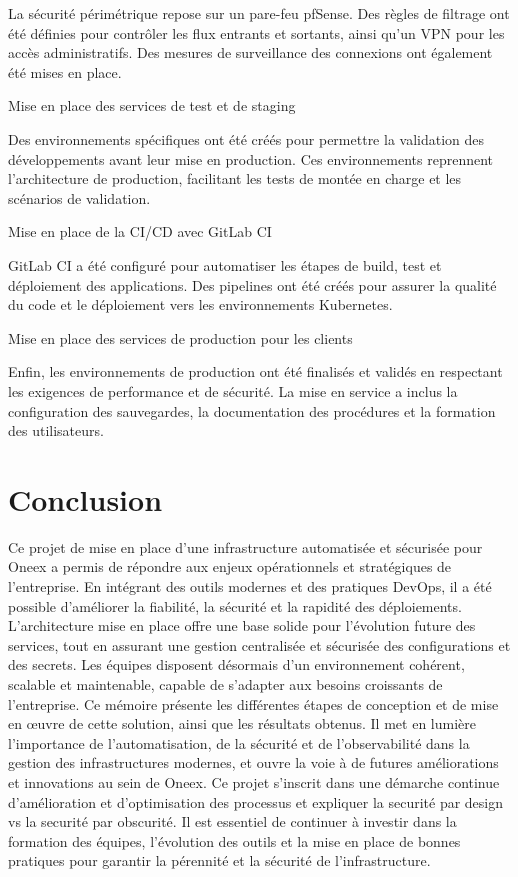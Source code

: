 La sécurité périmétrique repose sur un pare-feu pfSense. Des règles de filtrage ont été définies pour contrôler les flux entrants et sortants, ainsi qu’un VPN pour les accès administratifs. Des mesures de surveillance des connexions ont également été mises en place.

	{Mise en place des services de test et de staging}

Des environnements spécifiques ont été créés pour permettre la validation des développements avant leur mise en production. Ces environnements reprennent l’architecture de production, facilitant les tests de montée en charge et les scénarios de validation.

	{Mise en place de la CI/CD avec GitLab CI}

GitLab CI a été configuré pour automatiser les étapes de build, test et déploiement des applications. Des pipelines ont été créés pour assurer la qualité du code et le déploiement vers les environnements Kubernetes.

	{Mise en place des services de production pour les clients}

Enfin, les environnements de production ont été finalisés et validés en respectant les exigences de performance et de sécurité. La mise en service a inclus la configuration des sauvegardes, la documentation des procédures et la formation des utilisateurs.

\section{Conclusion}
Ce projet de mise en place d'une infrastructure automatisée et sécurisée pour Oneex a permis de répondre aux enjeux opérationnels et stratégiques de l'entreprise. En intégrant des outils modernes et des pratiques DevOps, il a été possible d'améliorer la fiabilité, la sécurité et la rapidité des déploiements.
L'architecture mise en place offre une base solide pour l'évolution future des services, tout en
assurant une gestion centralisée et sécurisée des configurations et des secrets. Les équipes disposent désormais d'un environnement cohérent, scalable et maintenable, capable de s'adapter aux besoins croissants de l'entreprise.
Ce mémoire présente les différentes étapes de conception et de mise en œuvre de cette solution, ainsi que
les résultats obtenus. Il met en lumière l'importance de l'automatisation, de la sécurité et de l'observabilité dans la gestion des infrastructures modernes, et ouvre la voie à de futures améliorations et innovations au sein de Oneex.
Ce projet s'inscrit dans une démarche continue d'amélioration et d'optimisation des processus
et expliquer la securité par design vs la securité par obscurité. Il est essentiel de continuer à investir dans la formation des équipes, l'évolution des outils et la mise en place de bonnes pratiques pour garantir la pérennité et la sécurité de l'infrastructure.
